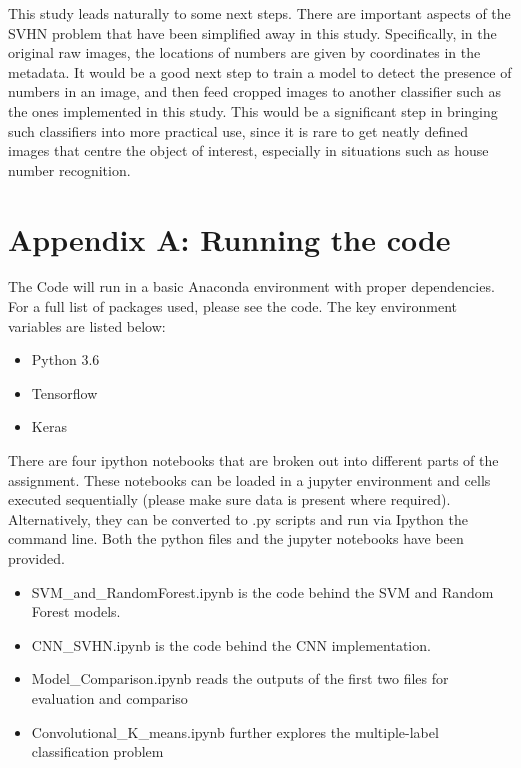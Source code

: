 \documentclass[12pt]{article}
\begin{document}
This study leads naturally to some next steps. There are important aspects of the SVHN problem that have been simplified away in this study. Specifically, in the original raw images, the locations of numbers are given by coordinates in the metadata. It would be a good next step to train a model to detect the presence of numbers in an image, and then feed cropped images to another classifier such as the ones implemented in this study. This would be a significant step in bringing such classifiers into more practical use, since it is rare to get neatly defined images that centre the object of interest, especially in situations such as house number recognition.\\

\medskip
\newpage

\appendix
\section{Appendix A: Running the code}
The Code will run in a basic Anaconda environment with proper dependencies. For a full list of packages used, please see the code. The key environment variables are listed below:
\begin{itemize}
  \item Python 3.6
  \item Tensorflow
  \item Keras
\end{itemize}

There are four ipython notebooks that are broken out into different parts of the assignment. These notebooks can be loaded in a jupyter environment and cells executed sequentially (please make sure data is present where required). Alternatively, they can be converted to .py scripts and run via Ipython the command line. Both the python files and the jupyter notebooks have been provided.
\begin{itemize}
  \item SVM\_and\_RandomForest.ipynb is the code behind the SVM and Random Forest models.
  \item CNN\_SVHN.ipynb is the code behind the CNN implementation.
  \item Model\_Comparison.ipynb reads the outputs of the first two files for evaluation and compariso
  \item Convolutional\_K\_means.ipynb further explores the multiple-label classification problem
\end{itemize}
\end{document}
